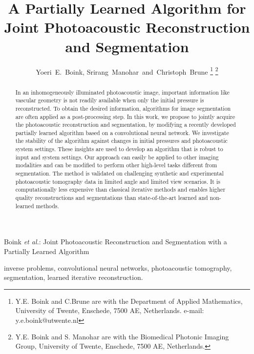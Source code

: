 \documentclass[journal]{IEEEtran}
\begin{document}
\title{A Partially Learned Algorithm for Joint Photoacoustic Reconstruction and Segmentation}

\author{Yoeri~E.~Boink, Srirang~Manohar~and~Christoph~Brune\vspace{-5mm}%
\thanks{Y.E. Boink and C.Brune are with the Department
of Applied Mathematics, University of Twente, Enschede, 7500 AE, Netherlands. e-mail: y.e.boink@utwente.nl}%
\thanks{Y.E. Boink and S. Manohar are with the Biomedical Photonic Imaging Group, University of Twente, Enschede, 7500 AE, Netherlands.}}

%
{Boink \MakeLowercase{\textit{et al.}}: Joint Photoacoustic Reconstruction and Segmentation with a Partially Learned Algorithm}

\maketitle

\begin{abstract}
In an inhomogeneously illuminated photoacoustic image, important information like vascular geometry is not readily available when only the initial pressure is reconstructed. To obtain the desired information, algorithms for image segmentation are often applied as a post-processing step. In this work, we propose to jointly acquire the photoacoustic reconstruction and segmentation, by modifying a recently developed partially learned algorithm based on a convolutional neural network. We investigate the stability of the algorithm against changes in initial pressures and photoacoustic system settings. These insights are used to develop an algorithm that is robust to input and system settings. Our approach can easily be applied to other imaging modalities and can be modified to perform other high-level tasks different from segmentation. The method is validated on challenging synthetic and experimental photoacoustic tomography data in limited angle and limited view scenarios. It is computationally less expensive than classical iterative methods and enables higher quality reconstructions and segmentations than state-of-the-art learned and non-learned methods.
\end{abstract}

\begin{IEEEkeywords}
inverse problems, convolutional neural networks, photoacoustic tomography, segmentation, learned iterative reconstruction.
\end{IEEEkeywords}
\end{document}
